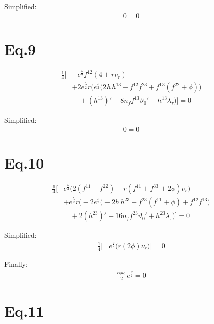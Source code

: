 \documentclass[12pt]{article}
\begin{document}
Simplified:
\begin{align*}
  0 = 0
\end{align*}

\section*{Eq.9}

\begin{align*}
\frac{1}{4} \Big[
 & - e^{\frac{\nu}{2}} f^{12} \left( 4 + r\nu_r \right) \\
 & + 2 e^{\frac{\lambda}{2}} r
   \Big(
     e^{\frac{\nu}{2}} \big(
       2h\,h^{13} - f^{12} f^{23} + f^{13}(f^{22} + \phi)
     \big) \\
     & \quad + (h^{13})'
     + 8 n_f f^{13} \vartheta_0'
     + h^{13} \lambda_\tau
   \Big)
\Big] = 0
\end{align*}

Simplified:
\begin{align*}
  0 = 0
\end{align*}

\section*{Eq.10}

\begin{align*}
\frac{1}{4} \Big[
 & e^{\frac{\nu}{2}} \Big(
     2(f^{11} - f^{22}) + r(f^{11} + f^{33} + 2\phi)\nu_r
   \Big) \\
 & + e^{\frac{\lambda}{2}} r \Big(
     -2 e^{\frac{\nu}{2}} \Big(
       -2 h\, h^{23} - f^{23}(f^{11} + \phi) + f^{12} f^{13}
     \Big) \\
     & \quad + 2 (h^{23})'
     + 16 n_f f^{23} \vartheta_0'
     + h^{23} \lambda_\tau
   \Big)
\Big] = 0
\end{align*}

Simplified:
\begin{align*}
\frac{1}{4} \Big[
 & e^{\frac{\nu}{2}} \Big(
     r(2\phi)\nu_r
   \Big)
\Big] = 0
\end{align*}

Finally:
\begin{align*}
\frac{r\phi\nu_r}{2} e^{\frac{\nu}{2}} = 0
\end{align*}

\section*{Eq.11}
\end{document}
